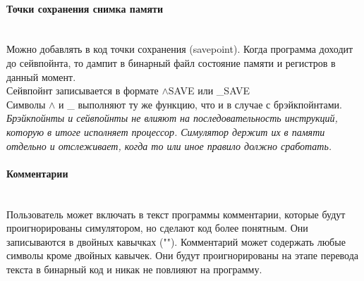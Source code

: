 \paragraph{Точки сохранения снимка памяти}~\\
Можно добавлять в код точки сохранения (savepoint). Когда программа доходит до сейвпойнта, то дампит в бинарный файл состояние памяти и регистров в данный момент.\\
Сейвпойнт записывается в формате $\wedge$SAVE или \_SAVE \\
Символы $\wedge$ и \_ выполняют ту же функцию, что и в случае с брэйкпойнтами. \\

{ \it \large
Брэйкпойнты и сейвпойнты не влияют на последовательность инструкций, которую в итоге исполняет процессор. Симулятор держит их в памяти отдельно и отслеживает, когда то или иное правило должно сработать.
}
\\

\paragraph{Комментарии}~\\
Пользователь может включать в текст программы комментарии, которые будут проигнорированы симулятором, но сделают код более понятным. Они записываются в двойных кавычках ("\space"). Комментарий может содержать любые символы кроме двойных кавычек.
Они будут проигнорированы на этапе перевода текста в бинарный код и никак не повлияют на программу.


